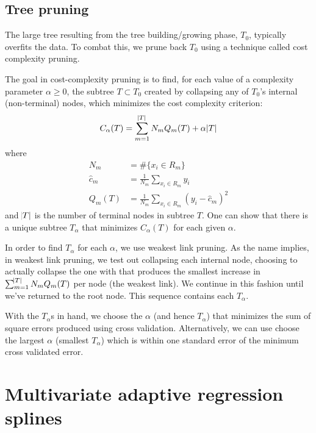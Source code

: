 \documentclass[12pt]{article}
\begin{document}

\subsection{Tree pruning} %
\label{sub:tree_pruning}

The large tree resulting from the tree building/growing phase, $T_{0}$, typically overfits the data. To combat this, we prune back $T_{0}$ using a technique called cost complexity pruning. 

The goal in cost-complexity pruning is to find, for each value of a complexity parameter $\alpha \geq 0$, the subtree $T \subset T_{0}$ created by collapsing any of $T_{0}$'s internal (non-terminal) nodes, which minimizes the cost complexity criterion:
%
\begin{equation}
    C_{\alpha}(T) = \sum_{m = 1}^{\abs{T}} N_{m} Q_{m}(T) + \alpha \abs{T}
\end{equation}
where
%
\begin{align}
  N_{m} &= \# \{x_{i} \in R_{m}\} \\
  \hat{c}_{m} &= \frac{1}{N_{m}} \sum_{x_{i} \in R_{m}} y_{i} \\
  Q_{m}(T) &= \frac{1}{N_{m}} \sum_{x_{i} \in R_{m}} (y_{i} - \hat{c}_{m})^2
\end{align}
and $\abs{T}$ is the number of terminal nodes in subtree $T$. One can show that there is a unique subtree $T_{\alpha}$ that minimizes $C_{\alpha}(T)$ for each given $\alpha$.

In order to find $T_{\alpha}$ for each $\alpha$, we use weakest link pruning. As the name implies, in weakest link pruning, we test out collapsing each internal node, choosing to actually collapse the one with that produces the smallest increase in $\sum_{m = 1}^{\abs{T}} N_{m} Q_{m}(T)$ per node (the weakest link). We continue in this fashion until we've returned to the root node. This sequence contains each $T_{\alpha}$. 

With the $T_{\alpha}$s in hand, we choose the $\alpha$ (and hence $T_{\alpha}$) that minimizes the sum of square errors produced using cross validation. Alternatively, we can use choose the largest $\alpha$ (smallest $T_{\alpha}$) which is within one standard error of the minimum cross validated error.





\section{Multivariate adaptive regression splines} %
\label{sec:mars}
\end{document}
